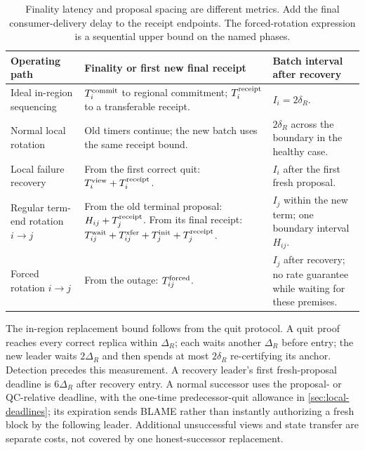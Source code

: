 \documentclass[11pt,a4paper,onecolumn]{article}
\newcounter{protocol}
\begin{document}
\begin{table}[H]\centering\small
\begin{tabularx}{\linewidth}{@{}>{\raggedright\arraybackslash}p{.24\linewidth}Y Y@{}}
\toprule
Operating path & Finality or first new final receipt & Batch interval after recovery\\
\midrule
Ideal in-region sequencing & $T_i^{\rm commit}$ to regional commitment;
$T_i^{\rm receipt}$ to a transferable receipt. & $I_i=2\delta_R$.\\
\addlinespace[3pt]
Normal local rotation & Old timers continue; the new batch uses the
same receipt bound. & $2\delta_R$ across the boundary in the healthy case.\\
\addlinespace[3pt]
Local failure recovery & From the first correct quit:
$T_i^{\rm view}+T_i^{\rm receipt}$. & $I_i$ after the first fresh proposal.\\
\addlinespace[3pt]
Regular term-end rotation $i\to j$ & From the old terminal proposal:
$H_{ij}+T_j^{\rm receipt}$. From its final receipt: $T_{ij}^{\rm wait}+T_{ij}^{\rm xfer}+T_j^{\rm init}+T_j^{\rm receipt}$. &
$I_j$ within the new term; one boundary interval $H_{ij}$.\\
\addlinespace[3pt]
Forced rotation $i\to j$ & From the outage:
$T_{ij}^{\rm forced}$.
& $I_j$ after recovery; no rate guarantee while waiting for these premises.\\
\bottomrule
\end{tabularx}
\caption{Finality latency and proposal spacing are different metrics.
Add the final consumer-delivery delay to the receipt endpoints.
The forced-rotation expression is a sequential upper bound on the named
phases.}
\label{tab:operating-paths}
\end{table}

The in-region replacement bound follows from the quit protocol. A quit proof
reaches every correct replica within $\Delta_R$; each waits another
$\Delta_R$ before entry; the new leader waits $2\Delta_R$ and then spends
at most $2\delta_R$ re-certifying its anchor. Detection precedes this
measurement. A recovery leader's first fresh-proposal deadline is
$6\Delta_R$ after recovery entry. A normal successor uses the proposal- or
QC-relative deadline, with the one-time predecessor-quit allowance in
\cref{sec:local-deadlines}; its expiration sends BLAME rather than instantly
authorizing a fresh block by the following leader. Additional unsuccessful views
and state transfer are separate costs, not covered by one honest-successor
replacement.
\end{document}
